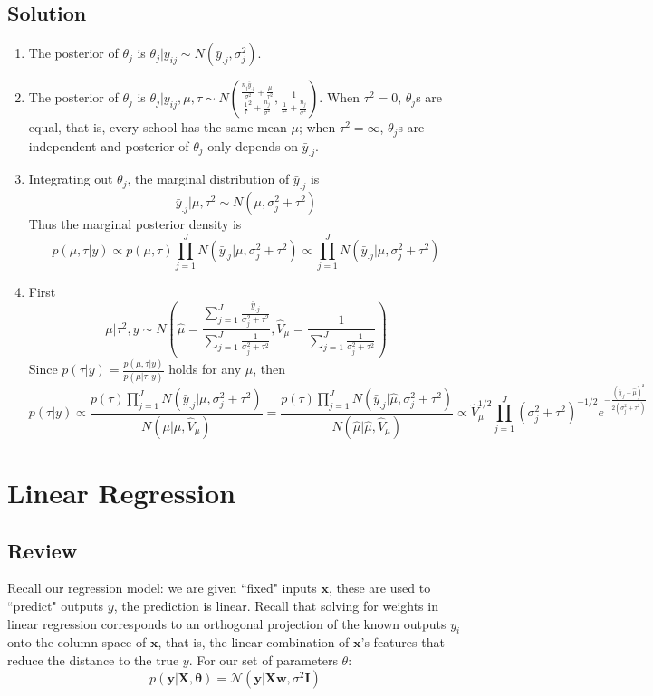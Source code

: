 \documentclass{harvardml}
\theoremstyle{definition}
\theoremstyle{plain}
\renewcommand{\v}[1]{\mathbf{#1}}
\begin{document}
\subsection{Solution}
\begin{enumerate}
\item The posterior of $\theta_j$ is $\theta_j| y_{ij} \sim N(\bar y_{.j},  \sigma_j^2)$.
\item The posterior of $\theta_j$ is $\theta_j| y_{ij}, \mu, \tau \sim N(\frac{\frac{n_j\bar y_{.j}}{\sigma^2} + \frac{\mu}{\tau^2}}{\frac1\tau^2 + \frac{n_j}{\sigma^2}},  \frac{1}{\frac{1}{\tau^2} + \frac{n_j}{\sigma^2}})$. When $\tau^2 =0$, $\theta_j$s are equal, that is, every school has the same mean $\mu$; when $\tau^2 =\infty$, $\theta_j$s are independent and posterior of $\theta_j$ only depends on $\bar y_{.j}$.
\item Integrating out $\theta_j$, the marginal distribution of $\bar y_{.j}$ is $$\bar y_{.j}|\mu, \tau^2 \sim N(\mu, \sigma^2_j  + \tau^2)$$
Thus the marginal posterior density is $$p(\mu, \tau|y)\propto p(\mu, \tau) \prod_{j=1}^JN(\bar y_{.j}|\mu, \sigma^2_j  + \tau^2) \propto \prod_{j=1}^JN(\bar y_{.j}|\mu, \sigma^2_j  + \tau^2) $$
\item First $$\mu|\tau^2, y \sim N(\hat\mu = \frac{\sum_{j=1}^J \frac{\bar y_{.j}}{\sigma_j^2 + \tau^2}}{\sum_{j=1}^J \frac{1}{\sigma_j^2 + \tau^2}}, \hat V_{\mu}=\frac1{\sum_{j=1}^J \frac{1}{\sigma_j^2 + \tau^2}})$$
Since $p(\tau|y ) = \frac{p(\mu, \tau|y)}{p(\mu|\tau, y)}$ holds for any $\mu$, then
$$p(\tau|y ) \propto \frac{p(\tau) \prod_{j=1}^JN(\bar y_{.j}|\mu, \sigma^2_j  + \tau^2)}{N(\mu|\hat \mu, \hat V_{\mu})} = \frac{p(\tau) \prod_{j=1}^JN(\bar y_{.j}|\hat\mu, \sigma^2_j  + \tau^2)}{N(\hat\mu|\hat \mu, \hat V_{\mu})} \propto \hat V_{\mu}^{1/2}\prod_{j=1}^J(\sigma^2_j  + \tau^2)^{-1/2}e^{-\frac{(\bar y_{.j}-\hat\mu)^2}{2(\sigma^2_j  + \tau^2)}}$$
\end{enumerate}
\section{Linear Regression}
\subsection{Review}

\noindent Recall our regression model: we are given ``fixed" inputs $\v x$,
these are used to ``predict" outputs $y$, the prediction is linear. Recall that solving for weights in linear regression corresponds to an orthogonal
projection of the known outputs $y_i$ onto the column space of $\v x$,
that is, the linear combination of $\v x$'s features that reduce the 
distance to the true $y$. For our set of parameters $\theta$:
$$ p(\v y | \v X, \v \theta) = \mathcal{N}(\v y | \v X \v w, \sigma^2 \v I) $$
\end{document}
